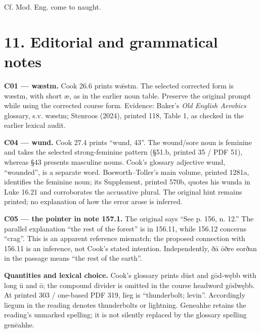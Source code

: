 Cf. Mod. Eng. come to naught.

\section*{11. Editorial and grammatical notes}

\textbf{C01 — wæstm.} Cook 26.6 prints wǣstm. The selected corrected form is wæstm, with short æ, as in the earlier noun table. Preserve the original prompt while using the corrected course form. Evidence: Baker’s \emph{Old English Aerobics} glossary, s.v. wæstm; Stenroos (2024), printed 118, Table 1, as checked in the earlier lexical audit.

\textbf{C04 — wund.} Cook 27.4 prints “wund, 43”. The wound/\allowbreak{}sore noun is feminine and takes the selected strong-feminine pattern (§51.b, printed 35 /\allowbreak{} PDF 51), whereas §43 presents masculine nouns. Cook’s glossary adjective wund, “wounded”, is a separate word. Bosworth–Toller’s main volume, printed 1281a, identifies the feminine noun; its Supplement, printed 570b, quotes his wunda in Luke 16.21 and corroborates the accusative plural. The original hint remains printed; no explanation of how the error arose is inferred.

\textbf{C05 — the pointer in note 157.1.} The original says “See p. 156, n. 12.” The parallel explanation “the rest of the forest” is in 156.11, while 156.12 concerns “crag”. This is an apparent reference mismatch; the proposed connection with 156.11 is an inference, not Cook’s stated intention. Independently, ðā ōðre eorðan in the passage means “the rest of the earth”.

\textbf{Quantities and lexical choice.} Cook’s glossary prints dūst and gōd-wębb with long ū and ō; the compound divider is omitted in the course headword gōdwębb. At printed 303 /\allowbreak{} one-based PDF 319, līeg is “thunderbolt; levin”. Accordingly līegum in the reading denotes thunderbolts or lightning. Geneahhe retains the reading’s unmarked spelling; it is not silently replaced by the glossary spelling genēahhe.

